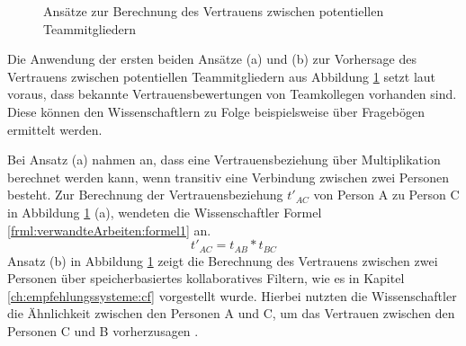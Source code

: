 \begin{figure}[h]
	\centering
	
	
	\caption{Ansätze zur Berechnung des Vertrauens zwischen potentiellen Teammitgliedern \cite[S. 5]{malinowski:2005}}
	\label{fig:verwandteArbeiten:abb2}
\end{figure}

Die Anwendung der ersten beiden Ansätze (a) und (b) zur Vorhersage des Vertrauens zwischen potentiellen Teammitgliedern aus Abbildung \ref{fig:verwandteArbeiten:abb2} setzt laut \textcite[S. 4ff.]{malinowski:2005} voraus, dass bekannte Vertrauensbewertungen von Teamkollegen vorhanden sind. Diese können den Wissenschaftlern zu Folge beispielsweise über Fragebögen ermittelt werden.

Bei Ansatz (a) nahmen \textcite[S. 5f.]{malinowski:2005} an, dass eine Vertrauensbeziehung über Multiplikation berechnet werden kann, wenn transitiv eine Verbindung zwischen zwei Personen besteht. Zur Berechnung der Vertrauensbeziehung $t'_{AC}$ von Person A zu Person C in Abbildung \ref{fig:verwandteArbeiten:abb2} (a), wendeten die Wissenschaftler Formel \ref{frml:verwandteArbeiten:formel1} an.
\begin{equation}
	t'_{AC} = t_{AB} * t_{BC}
	\label{frml:verwandteArbeiten:formel1}
\end{equation}
Ansatz (b) in Abbildung \ref{fig:verwandteArbeiten:abb2} zeigt die Berechnung des Vertrauens zwischen zwei Personen über speicherbasiertes kollaboratives Filtern, wie es in Kapitel \ref{ch:empfehlungssysteme:cf} vorgestellt wurde. Hierbei nutzten die Wissenschaftler die Ähnlichkeit zwischen den Personen A und C, um das Vertrauen zwischen den Personen C und B vorherzusagen \cite[S. 6]{malinowski:2005}.


